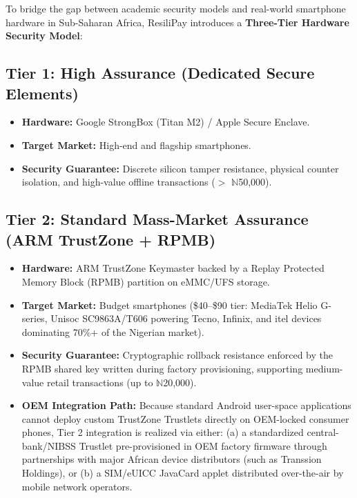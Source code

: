 \documentclass[conference]{IEEEtran}
\begin{document}
To bridge the gap between academic security models and real-world smartphone hardware in Sub-Saharan Africa, ResiliPay introduces a \textbf{Three-Tier Hardware Security Model}:

\subsection{Tier 1: High Assurance (Dedicated Secure Elements)}
\begin{itemize}
    \item \textbf{Hardware:} Google StrongBox (Titan M2) / Apple Secure Enclave.
    \item \textbf{Target Market:} High-end and flagship smartphones.
    \item \textbf{Security Guarantee:} Discrete silicon tamper resistance, physical counter isolation, and high-value offline transactions ($>$ $\mathbb{N}$50,000).
\end{itemize}

\subsection{Tier 2: Standard Mass-Market Assurance (ARM TrustZone + RPMB)}
\begin{itemize}
    \item \textbf{Hardware:} ARM TrustZone Keymaster backed by a Replay Protected Memory Block (RPMB) partition on eMMC/UFS storage.
    \item \textbf{Target Market:} Budget smartphones (\$40--\$90 tier: MediaTek Helio G-series, Unisoc SC9863A/T606 powering Tecno, Infinix, and itel devices dominating 70\%+ of the Nigerian market).
    \item \textbf{Security Guarantee:} Cryptographic rollback resistance enforced by the RPMB shared key written during factory provisioning, supporting medium-value retail transactions (up to $\mathbb{N}$20,000).
    \item \textbf{OEM Integration Path:} Because standard Android user-space applications cannot deploy custom TrustZone Trustlets directly on OEM-locked consumer phones, Tier 2 integration is realized via either: (a) a standardized central-bank/NIBSS Trustlet pre-provisioned in OEM factory firmware through partnerships with major African device distributors (such as Transsion Holdings), or (b) a SIM/eUICC JavaCard applet distributed over-the-air by mobile network operators.
\end{itemize}
\end{document}
